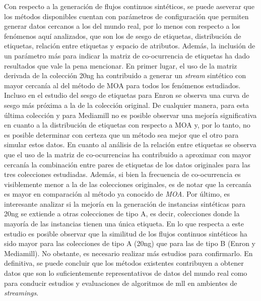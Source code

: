 Con respecto a la generación de flujos continuos sintéticos, se puede aseverar
que los métodos disponibles cuentan con parámetros de configuración que permiten
generar datos cercanos a los del mundo real, por lo menos con respecto a los
fenómenos aquí analizados, que son los de sesgo de etiquetas, distribución
de etiquetas, relación entre etiquetas y espacio de atributos.  Además, la
inclusión de un parámetro más para indicar la matriz de co-ocurrencia de
etiquetas ha dado resultados que vale la pena mencionar. En primer lugar, el uso
de la matriz derivada de la colección 20ng ha contribuido a generar un
\textit{stream} sintético con mayor cercanía al del método de MOA para todos los
fenómenos estudiados. Incluso en el estudio del sesgo de etiquetas para Enron se
observa una curva de sesgo más próxima a la de la colección original. De
cualquier manera, para esta última colección y para Mediamill no es posible
observar una mejoría significativa en cuanto a la distribución de etiquetas con
respecto a MOA y, por lo tanto, no es posible determinar con certeza que un
método sea mejor que el otro para simular estos datos. En cuanto al análisis de
la relación entre etiquetas se observa que el uso de la matriz de co-ocurrencias
ha contribuido a aproximar con mayor cercanía la combinación entre pares de
etiquetas de los datos originales para las tres colecciones estudiadas. Además,
si bien la frecuencia de co-ocurrencia es visiblemente menor a la de las
colecciones originales, es de notar que la cercanía es mayor en comparación al
método ya conocido de \textit{MOA}\@. Por último, es interesante analizar si la
mejoría en la generación de instancias sintéticas para 20ng se extiende a otras
colecciones de tipo A, es decir, colecciones donde la mayoría de las instancias
tienen una única etiqueta. En lo que respecta a este estudio es posible observar
que la similitud de los flujos continuos sintéticos ha sido mayor para las
colecciones de tipo A (20ng) que para las de tipo B (Enron y Mediamill). No
obstante, es necesario realizar más estudios para confirmarlo.  En definitiva,
se puede concluir que los métodos existentes contribuyen a obtener datos que son
lo suficientemente representativos de datos del mundo real como para conducir
estudios y evaluaciones de algoritmos de \acrshort{mll} en ambientes de
\textit{streamings}.

